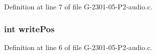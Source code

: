 Definition at line 7 of file G-\/2301-\/05-\/\-P2-\/audio.\-c.

\hypertarget{_g-2301-05-_p2-audio_8c_a8693afd6c4562264a3cb24736198e435}{
\subsubsection[{write\-Pos}]{\setlength{\rightskip}{0pt plus 5cm}int write\-Pos}}\label{_g-2301-05-_p2-audio_8c_a8693afd6c4562264a3cb24736198e435}


Definition at line 6 of file G-\/2301-\/05-\/\-P2-\/audio.\-c.

